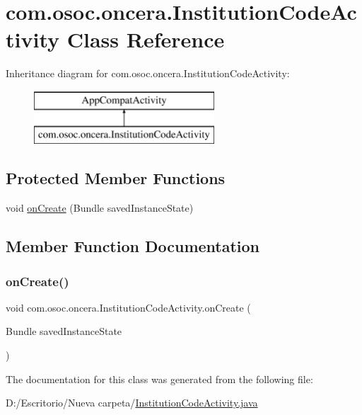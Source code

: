 \hypertarget{classcom_1_1osoc_1_1oncera_1_1_institution_code_activity}{}\section{com.\+osoc.\+oncera.\+Institution\+Code\+Activity Class Reference}
\label{classcom_1_1osoc_1_1oncera_1_1_institution_code_activity}
Inheritance diagram for com.\+osoc.\+oncera.\+Institution\+Code\+Activity\+:\begin{figure}[H]
\begin{center}
\leavevmode
\includegraphics[height=2.000000cm]{classcom_1_1osoc_1_1oncera_1_1_institution_code_activity}
\end{center}
\end{figure}
\subsection*{Protected Member Functions}
\begin{DoxyCompactItemize}
\item 
void \mbox{\hyperlink{classcom_1_1osoc_1_1oncera_1_1_institution_code_activity_a3f1d5404a4d59605fb0aa1b7f47296bd}{on\+Create}} (Bundle saved\+Instance\+State)
\end{DoxyCompactItemize}


\subsection{Member Function Documentation}
\mbox{\label{classcom_1_1osoc_1_1oncera_1_1_institution_code_activity_a3f1d5404a4d59605fb0aa1b7f47296bd}} 
\subsubsection{\texorpdfstring{onCreate()}{onCreate()}}
{\footnotesize\ttfamily void com.\+osoc.\+oncera.\+Institution\+Code\+Activity.\+on\+Create (\begin{DoxyParamCaption}\item[{Bundle}]{saved\+Instance\+State }\end{DoxyParamCaption})\hspace{0.3cm}{\ttfamily [protected]}}



The documentation for this class was generated from the following file\+:\begin{DoxyCompactItemize}
\item 
D\+:/\+Escritorio/\+Nueva carpeta/\mbox{\hyperlink{_institution_code_activity_8java}{Institution\+Code\+Activity.\+java}}\end{DoxyCompactItemize}
